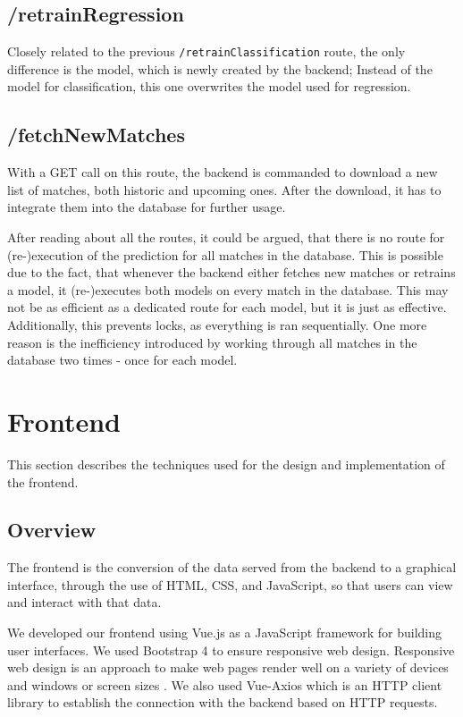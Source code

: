 \subsection{/retrainRegression}
Closely related to the previous \lstinline[columns=fixed]{/retrainClassification} route, the only difference is the model, which is newly created by the backend; Instead of the model for classification, this one overwrites the model used for regression.

\subsection{/fetchNewMatches}
With a GET call on this route, the backend is commanded to download a new list of matches, both historic and upcoming ones. After the download, it has to integrate them into the database for further usage.

After reading about all the routes, it could be argued, that there is no route for (re-)execution of the prediction for all matches in the database. This is possible due to the fact, that whenever the backend either fetches new matches or retrains a model, it (re-)executes both models on every match in the database. This may not be as efficient as a dedicated route for each model, but it is just as effective. Additionally, this prevents locks, as everything is ran sequentially. One more reason is the inefficiency introduced by working through all matches in the database two times - once for each model.


\section{Frontend}
This section describes the techniques used for the design and implementation of the frontend.
\subsection{Overview}
The frontend is the conversion of the data served from the backend to a graphical interface,
through the use of HTML, CSS, and JavaScript, so that users can view and interact with that data.

We developed our frontend using Vue.js as a JavaScript framework for building user interfaces.
We used Bootstrap 4 to ensure responsive web design. Responsive web design is an approach to make web pages render well on a variety of devices and windows or screen sizes \cite{responsive:2011}. 
We also used Vue-Axios which is an HTTP client library to establish the connection with the backend based on HTTP requests. 

